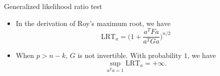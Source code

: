 \documentclass{beamer}
\theoremstyle{plain}
\theoremstyle{definition}
\theoremstyle{remark}
\begin{document}
\begin{frame}{Generalized likelihood ratio test}
    \begin{itemize}
        \item
        In the derivation of Roy's maximum root, we have
$$
        \text{LRT}_a=\Big(1+\frac{a^T F a}{a^T G a}\Big)^{n/2}
$$
        \item
    When $p> n-k$, $G$ is not invertible. With probability $1$, we have
            $$
            \sup\limits_{a^T a=1} \text{LRT}_a=+\infty.
            $$
    \end{itemize}
\end{frame}
\end{document}
